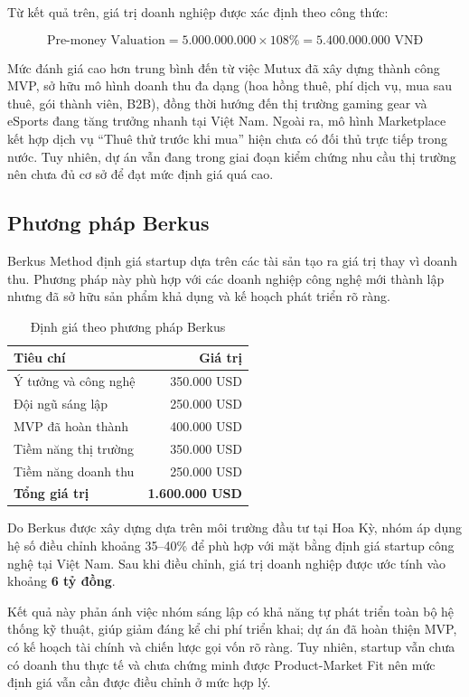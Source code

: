 Từ kết quả trên, giá trị doanh nghiệp được xác định theo công thức:

\[
\text{Pre-money Valuation}
=
5.000.000.000
\times
108\%
=
5.400.000.000 \text{ VNĐ}
\]

Mức đánh giá cao hơn trung bình đến từ việc Mutux đã xây dựng thành công MVP, sở hữu mô hình doanh thu đa dạng (hoa hồng thuê, phí dịch vụ, mua sau thuê, gói thành viên, B2B), đồng thời hướng đến thị trường gaming gear và eSports đang tăng trưởng nhanh tại Việt Nam. Ngoài ra, mô hình Marketplace kết hợp dịch vụ ``Thuê thử trước khi mua'' hiện chưa có đối thủ trực tiếp trong nước. Tuy nhiên, dự án vẫn đang trong giai đoạn kiểm chứng nhu cầu thị trường nên chưa đủ cơ sở để đạt mức định giá quá cao.

\subsection{Phương pháp Berkus}

Berkus Method định giá startup dựa trên các tài sản tạo ra giá trị thay vì doanh thu. Phương pháp này phù hợp với các doanh nghiệp công nghệ mới thành lập nhưng đã sở hữu sản phẩm khả dụng và kế hoạch phát triển rõ ràng.

\begin{table}[H]
\centering
\caption{Định giá theo phương pháp Berkus}
\begin{tabular}{lr}
\toprule
\textbf{Tiêu chí} & \textbf{Giá trị} \\
\midrule
Ý tưởng và công nghệ & 350.000 USD \\
Đội ngũ sáng lập & 250.000 USD \\
MVP đã hoàn thành & 400.000 USD \\
Tiềm năng thị trường & 350.000 USD \\
Tiềm năng doanh thu & 250.000 USD \\
\midrule
\textbf{Tổng giá trị} & \textbf{1.600.000 USD} \\
\bottomrule
\end{tabular}
\end{table}

Do Berkus được xây dựng dựa trên môi trường đầu tư tại Hoa Kỳ, nhóm áp dụng hệ số điều chỉnh khoảng 35--40\% để phù hợp với mặt bằng định giá startup công nghệ tại Việt Nam. Sau khi điều chỉnh, giá trị doanh nghiệp được ước tính vào khoảng \textbf{6 tỷ đồng}.

Kết quả này phản ánh việc nhóm sáng lập có khả năng tự phát triển toàn bộ hệ thống kỹ thuật, giúp giảm đáng kể chi phí triển khai; dự án đã hoàn thiện MVP, có kế hoạch tài chính và chiến lược gọi vốn rõ ràng. Tuy nhiên, startup vẫn chưa có doanh thu thực tế và chưa chứng minh được Product-Market Fit nên mức định giá vẫn cần được điều chỉnh ở mức hợp lý.

